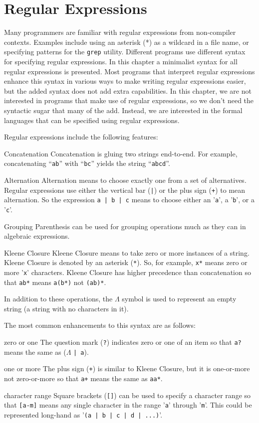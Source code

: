 \documentclass[letterpaper,12pt,openany,reqno]{book}%
\newcommand{\code}[1] {\lstinline[breaklines=yes,breakatwhitespace=yes]{#1}}
\newenvironment{mydesc}[1][9em]
  {
     \begin{basedescript}
     {
      \renewcommand{\makelabel}[1]{\bfseries##1}
      \desclabelwidth{ #1 }
      \desclabelstyle{\multilinelabel}
     }
  }
  {
     \end{basedescript}%
  }
\begin{document}
\chapter{Regular Expressions}
Many programmers are familiar with regular expressions from non-compiler contexts. Examples include using an asterisk (*) as a wildcard in a file name, or specifying patterns for the \code{grep} utility. Different programs use different syntax for specifying regular expressions. In this chapter a minimalist syntax for all regular expressions is presented. Most programs that interpret regular expressions enhance this syntax in various ways to make writing regular expressions easier, but the added syntax does not add extra capabilities. In this chapter, we are not interested in programs that make use of regular expressions, so we don't need the syntactic sugar that many of the add. Instead, we are interested in the formal languages that can be specified using regular expressions.

Regular expressions include the following features:
\begin{mydesc}[10em]
	\item[Concatenation] Concatenation is gluing two strings end-to-end. For example, concatenating ``\code{ab}'' with ``\code{bc}'' yields the string ``\code{abcd}''.
  \item[Alternation] Alternation means to choose exactly one from a set of alternatives. Regular expressions use either the vertical bar (\code{|}) or the plus sign (\code{+}) to mean alternation. So the expression \code{a | b | c} means to choose either an '\code{a}', a '\code{b}', or a '\code{c}'. 
	\item[Grouping] Parenthesis can be used for grouping operations much as they can in algebraic expressions.
	\item[Kleene Closure] Kleene Closure means to take zero or more instances of a string. Kleene Closure is denoted by an asterisk (\code{*}). So, for example, \code{x*} means zero or more '\code{x}' characters. Kleene Closure has higher precedence than concatenation so that \code{ab*} means \code{a(b*)} not \code{(ab)*}.
\end{mydesc}

In addition to these operations, the $\Lambda$ symbol is used to represent an empty string (a string with no characters in it).

The most common enhancements to this syntax are as follows:
\begin{mydesc}
\item[zero or one] The question mark
 (\code{?}) 
indicates zero or one of an item so that \code{a?} 
means the same as ($\Lambda$ \code{| a}).
\item[one or more] The plus sign (\code{+}) is similar to Kleene Closure, but it is one-or-more not zero-or-more so that \code{a+} means the same as \code{aa*}.
\item[character range] Square brackets (\code{[]}) can be used to specify a character range so that \code{[a-m]} means any single character in the range '\code{a}' through '\code{m}'. This could be represented long-hand as '\code{(a | b | c | d | ...)}'.
\end{mydesc}
\end{document}
